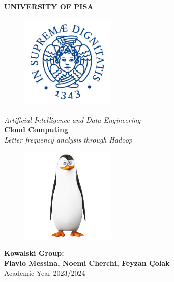 \begin{titlepage}
    \centering
    \vspace*{\fill}
    {\LARGE \textbf{UNIVERSITY OF PISA}}\\[0.5cm]
    \begin{figure}[h]
        \centering
        \includegraphics[width=0.4\textwidth]{media/university-of-Pisa-logo.jpg} 
    \end{figure}
    {\Large \textit{Artificial Intelligence and Data Engineering}}\\[1.5cm]
    {\LARGE \textbf{Cloud Computing}}\\[1cm]
    {\Large \textit{Letter frequency analysis through Hadoop}}\\[2cm]
    \begin{figure}[h]
        \centering
        \includegraphics[width=0.4\textwidth]{media/Kowalski4.jpg} 
    \end{figure}
    {\Large \textbf{Kowalski Group:}}\\[0.5cm]
    {\large \textbf{Flavio Messina, Noemi Cherchi, Feyzan Çolak}}\\[0.5cm]
    {\large Academic Year 2023/2024}
    \vspace*{\fill}
\end{titlepage}